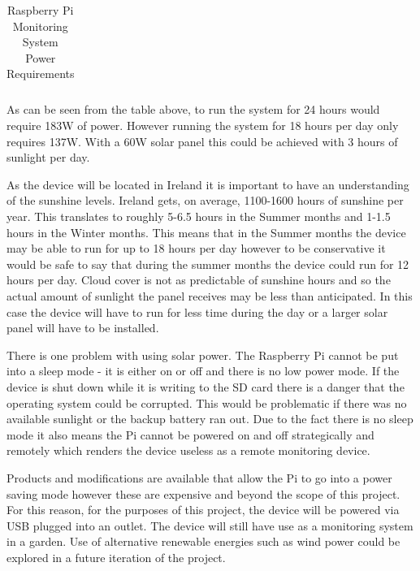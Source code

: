 \documentclass[10pt,a4paper]{article}
\begin{document}
\begin{table}[]
\begin{tabular}{lllllllll}
                                                                &                                    &                                   &                                    &                                            &                                                      &                                                      &                                                      &                                                     \\ \hline
\end{tabular}
\caption{Raspberry Pi Monitoring System Power Requirements}
\label{tab:powerRequirements}
\end{table}

As can be seen from the table above, to run the system for 24 hours would require 183W of power. However running the system for 18 hours per day only requires 137W. With a 60W solar panel this could be achieved with 3 hours of sunlight per day. 

As the device will be located in Ireland it is important to have an understanding of the sunshine levels. Ireland gets, on average, 1100-1600 hours of sunshine per year\citep{website:metsunshine}. This translates to roughly 5-6.5 hours in the Summer months and 1-1.5 hours in the Winter months. This means that in the Summer months the device may be able to run for up to 18 hours per day however to be conservative it would be safe to say that during the summer months the device could run for 12 hours per day. Cloud cover is not as predictable of sunshine hours and so the actual amount of sunlight the panel receives may be less than anticipated. In this case the device will have to run for less time during the day or a larger solar panel will have to be installed. 

There is one problem with using solar power. The Raspberry Pi cannot be put into a sleep mode - it is either on or off and there is no low power mode. If the device is shut down while it is writing to the SD card there is a danger that the operating system could be corrupted. This would be problematic if there was no available sunlight or the backup battery ran out. Due to the fact there is no sleep mode it also means the Pi cannot be powered on and off strategically and remotely which renders the device useless as a remote monitoring device. 

Products and modifications are available that allow the Pi to go into a power saving mode however these are expensive and beyond the scope of this project. For this reason, for the purposes of this project, the device will be powered via USB plugged into an outlet. The device will still have use as a monitoring system in a garden. Use of alternative renewable energies such as wind power could be explored in a future iteration of the project.
\end{document}
